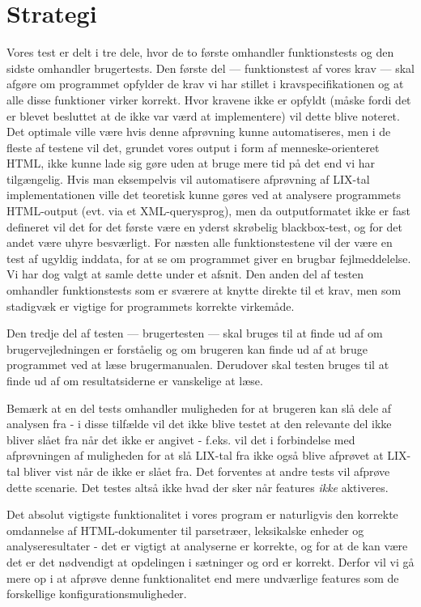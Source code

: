\documentclass[a4paper,oneside,article, titlepage]{memoir}
\begin{document}
\chapter{Strategi}
Vores test er delt i tre dele, hvor de to første omhandler
funktionstests og den sidste omhandler brugertests. Den første del ---
funktionstest af vores krav --- skal afgøre om programmet opfylder de
krav vi har stillet i kravspecifikationen og at alle disse funktioner
virker korrekt. Hvor kravene ikke er opfyldt (måske fordi det er
blevet besluttet at de ikke var værd at implementere) vil dette blive
noteret. Det optimale ville være hvis denne afprøvning kunne
automatiseres, men i de fleste af testene vil det, grundet vores
output i form af menneske-orienteret HTML, ikke kunne lade sig gøre
uden at bruge mere tid på det end vi har tilgængelig. Hvis man
eksempelvis vil automatisere afprøvning af LIX-tal implementationen
ville det teoretisk kunne gøres ved at analysere programmets
HTML-output (evt. via et XML-querysprog), men da outputformatet ikke
er fast defineret vil det for det første være en yderst skrøbelig
blackbox-test, og for det andet være uhyre besværligt. For næsten alle
funktionstestene vil der være en test af ugyldig inddata, for at se om
programmet giver en brugbar fejlmeddelelse. Vi har dog valgt at samle
dette under et afsnit. Den anden del af testen omhandler
funktionstests som er sværere at knytte direkte til et krav, men som
stadigvæk er vigtige for programmets korrekte virkemåde.

Den tredje del af testen --- brugertesten --- skal bruges til at finde
ud af om brugervejledningen er forståelig og om brugeren kan finde ud
af at bruge programmet ved at læse brugermanualen. Derudover skal
testen bruges til at finde ud af om resultatsiderne er vanskelige at
læse.

Bemærk at en del tests omhandler muligheden for at brugeren kan slå
dele af analysen fra - i disse tilfælde vil det ikke blive testet at
den relevante del ikke bliver slået fra når det ikke er angivet -
f.eks. vil det i forbindelse med afprøvningen af muligheden for at slå
LIX-tal fra ikke også blive afprøvet at LIX-tal bliver vist når de
ikke er slået fra. Det forventes at andre tests vil afprøve dette
scenarie. Det testes altså ikke hvad der sker når features
\textit{ikke} aktiveres.

Det absolut vigtigste funktionalitet i vores program er naturligvis
den korrekte omdannelse af HTML-dokumenter til parsetræer, leksikalske
enheder og analyseresultater - det er vigtigt at analyserne er
korrekte, og for at de kan være det er det nødvendigt at opdelingen i
sætninger og ord er korrekt. Derfor vil vi gå mere op i at afprøve
denne funktionalitet end mere undværlige features som de forskellige
konfigurationsmuligheder.
\end{document}
